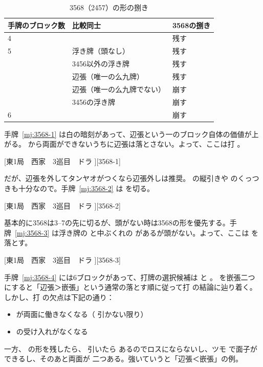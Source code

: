 \documentclass[../nankiru_main.tex]{subfiles}
\begin{document}
\begin{table}
  \centering
  \begin{tabular}{lll}
    手牌のブロック数 & 比較同士 & 3568の捌き \\
    \hline\hline
    4 & & 残す \\
    \hline
    5 & 浮き牌（頭なし） & 残す \\
      & 3456以外の浮き牌 & 残す \\
      & 辺張（唯一の么九牌） & 残す \\
      & 辺張（唯一の么九牌でない） & 崩す \\
      & 3456の浮き牌 & 崩す \\
    \hline
    6 & & 崩す \\
    \hline\hline
  \end{tabular}
  \caption{3568（2457）の形の捌き\citep{yuusee-3568, clearrain-3568}}
  \label{tab:3568}
\end{table}

手牌~\ref{mj:3568-1} は白の暗刻があって、辺張という一のブロック自体の価値が上がる。 から両面ができないうちに辺張は落とさない。よって、ここは打 。

[東1局　西家　3巡目　ドラ ][3568-1]

だが、辺張を外してタンヤオがつくなら辺張外しは推奨。 の縦引きや  のくっつきも十分なので。手牌~\ref{mj:3568-2} は  を切る。

[東1局　西家　3巡目　ドラ ][3568-2]

基本的に3568は3--7の先に切るが、頭がない時は3568の形を優先する。手牌~\ref{mj:3568-3} は浮き牌の  と中ぶくれの  があるが頭がない。よって、ここは  を落とす。

[東1局　西家　3巡目　ドラ ][3568-3]

手牌~\ref{mj:3568-4} には6ブロックがあって、打牌の選択候補は  と 。 を嵌張二つにすると「辺張＞嵌張」という通常の落とす順に従って打  の結論に辿り着く。しかし、打  の欠点は下記の通り：

\begin{itemize}
\item {} が両面に働きなくなる（ 引かない限り）
\item {} の受け入れがなくなる
\end{itemize}

一方、 の形を残したら、 引いたら  あるのでロスにならないし、ツモ  で面子ができるし、そのあと両面が  二つある。強いていうと「辺張＜嵌張」の例\citep{clearrain-3568}。
\end{document}

